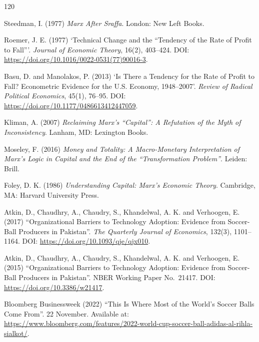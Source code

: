 \begin{singlespace}
\begin{thebibliography}{120}

Steedman, I. (1977) \emph{Marx After Sraffa}.
London: New Left Books.

Roemer, J. E. (1977) `Technical Change and the ``Tendency of the Rate of Profit to Fall'''.
\emph{Journal of Economic Theory}, 16(2), 403--424.
DOI: \url{https://doi.org/10.1016/0022-0531(77)90016-3}.

Basu, D. and Manolakos, P. (2013) `Is There a Tendency for the Rate of Profit to Fall? Econometric Evidence for the U.S. Economy, 1948--2007'.
\emph{Review of Radical Political Economics}, 45(1), 76--95.
DOI: \url{https://doi.org/10.1177/0486613412447059}.

Kliman, A. (2007) \emph{Reclaiming Marx's \enquote{Capital}: A Refutation of the Myth of Inconsistency}.
Lanham, MD: Lexington Books.

Moseley, F. (2016) \emph{Money and Totality: A Macro-Monetary Interpretation of Marx's Logic in \emph{Capital} and the End of the \enquote{Transformation Problem}}.
Leiden: Brill.

Foley, D. K. (1986) \emph{Understanding Capital: Marx's Economic Theory}.
Cambridge, MA: Harvard University Press.


Atkin, D., Chaudhry, A., Chaudry, S., Khandelwal, A. K. and Verhoogen, E. (2017)
``Organizational Barriers to Technology Adoption: Evidence from Soccer-Ball Producers in Pakistan''.
\emph{The Quarterly Journal of Economics}, 132(3), 1101--1164.
DOI: \url{https://doi.org/10.1093/qje/qjx010}.

Atkin, D., Chaudhry, A., Chaudry, S., Khandelwal, A. K. and Verhoogen, E. (2015)
``Organizational Barriers to Technology Adoption: Evidence from Soccer-Ball Producers in Pakistan''.
NBER Working Paper No.\ 21417.
DOI: \url{https://doi.org/10.3386/w21417}.

Bloomberg Businessweek (2022)
``This Is Where Most of the World's Soccer Balls Come From''.
22 November.
Available at: \url{https://www.bloomberg.com/features/2022-world-cup-soccer-ball-adidas-al-rihla-sialkot/}.


\end{thebibliography}
\end{singlespace}
